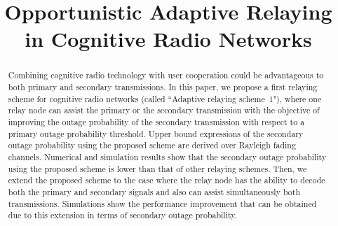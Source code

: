 \documentclass[conference,twocolumn]{IEEEtran}
\begin{document}
\title{Opportunistic Adaptive Relaying in Cognitive Radio Networks}


\author
{
\and
{}
\and
{}
 }


\maketitle

\begin{abstract}
Combining cognitive radio technology with user cooperation could be advantageous to both primary and secondary  transmissions. In this paper, we propose a first relaying scheme for cognitive radio networks (called ``Adaptive relaying scheme~1"), where one relay node can assist the primary or the secondary transmission with the objective of improving the outage probability of the secondary transmission with respect to a
primary outage probability threshold. Upper bound expressions of the secondary outage probability using the proposed scheme are derived over Rayleigh fading channels. Numerical and simulation results show that the secondary outage probability using the proposed scheme is lower than that of other relaying schemes. Then, we extend the proposed scheme to the case where the relay node has the ability to decode both the primary and secondary signals and also can assist simultaneously both transmissions. Simulations show the performance improvement that can be obtained due to this extension in terms of secondary outage probability.
\end{abstract}

\IEEEpeerreviewmaketitle
\end{document}
